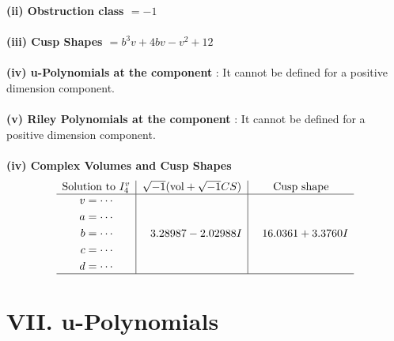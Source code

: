 \documentclass[1p]{elsarticle_modified}
\theoremstyle{definition}
\newcommand{\I}{\sqrt{-1}}
\begin{document}
\flushleft \textbf{(ii) Obstruction class $= -1$}\\~\\
\flushleft \textbf{(iii) Cusp Shapes $= b^3 v+4 b v- v^2+12$}\\~\\
\flushleft \textbf{(iv) u-Polynomials at the component} : It cannot be defined for a positive dimension component.\\~\\
\flushleft \textbf{(v) Riley Polynomials at the component} : It cannot be defined for a positive dimension component.\\~\\
\newpage\flushleft \textbf{(iv) Complex Volumes and Cusp Shapes}
$$\begin{array}{c|c|c} 
\text{Solution to }I^v_{4}& \I (\text{vol} + \sqrt{-1}CS) & \text{Cusp shape}\\
 \hline 
\begin{aligned}
v &= \cdots \\
a &= \cdots \\
b &= \cdots \\
c &= \cdots \\
d &= \cdots\end{aligned}
 & \phantom{-}3.28987 - 2.02988 I & \phantom{-}16.0361 + 3.3760 I\\
 \hline 
 \end{array}
$$
\newpage\renewcommand{\arraystretch}{1}
\centering \section*{ VII. u-Polynomials}
\end{document}
